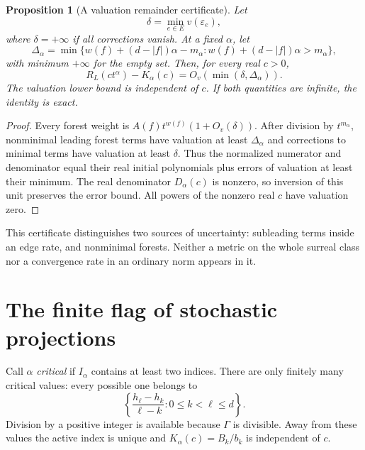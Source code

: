 \documentclass[11pt]{article}
\numberwithin{equation}{section}
\newtheorem{proposition}[theorem]{Proposition}
\theoremstyle{definition}
\theoremstyle{remark}
\newcommand{\bigO}[1]{O_v(#1)}
\begin{document}
\begin{proposition}[A valuation remainder certificate]\label{markov:prop:remainder}
Let
\[
 \delta=\min_{e\in E}v(\varepsilon_e),
\]
where $\delta=+\infty$ if all corrections vanish. At a fixed $\alpha$, let
\[
 \Delta_\alpha=
 \min\{w(f)+(d-|f|)\alpha-m_\alpha:
                 w(f)+(d-|f|)\alpha>m_\alpha\},
\]
with minimum $+\infty$ for the empty set. Then, for every real $c>0$,
\begin{equation}\label{markov:eq:remainder}
 R_L(c t^\alpha)-K_\alpha(c)
   =\bigO{\min(\delta,\Delta_\alpha)}.
\end{equation}
The valuation lower bound is independent of $c$. If both quantities are infinite,
the identity is exact.
\end{proposition}

\begin{proof}
Every forest weight is $A(f)t^{w(f)}(1+\bigO{\delta})$. After division by
$t^{m_\alpha}$, nonminimal leading forest terms have valuation at least
$\Delta_\alpha$ and corrections to minimal terms have valuation at least
$\delta$. Thus the normalized numerator and denominator equal their real initial
polynomials plus errors of valuation at least their minimum. The real denominator
$D_\alpha(c)$ is nonzero, so inversion of this unit preserves the error bound.
All powers of the nonzero real $c$ have valuation zero.
\end{proof}

This certificate distinguishes two sources of uncertainty: subleading terms
inside an edge rate, and nonminimal forests. Neither a metric on the whole
surreal class nor a convergence rate in an ordinary norm appears in it.

\section{The finite flag of stochastic projections}\label{markov:sec:flag}

Call $\alpha$ \emph{critical} if $I_\alpha$ contains at least two indices. There
are only finitely many critical values: every possible one belongs to
\begin{equation}\label{markov:eq:candidate-scales}
 \left\{\frac{h_\ell-h_k}{\ell-k}:0\le k<\ell\le d\right\}.
\end{equation}
Division by a positive integer is available because $\Gamma$ is divisible.
Away from these values the active index is unique and
$K_\alpha(c)=B_k/b_k$ is independent of $c$.
\end{document}
